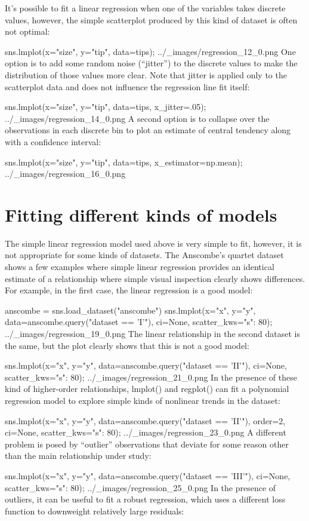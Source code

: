 It’s possible to fit a linear regression when one of the variables takes discrete values, however, the simple scatterplot produced by this kind of dataset is often not optimal:

sns.lmplot(x="size", y="tip", data=tips);
../_images/regression_12_0.png
One option is to add some random noise (“jitter”) to the discrete values to make the distribution of those values more clear. Note that jitter is applied only to the scatterplot data and does not influence the regression line fit itself:

sns.lmplot(x="size", y="tip", data=tips, x_jitter=.05);
../_images/regression_14_0.png
A second option is to collapse over the observations in each discrete bin to plot an estimate of central tendency along with a confidence interval:

sns.lmplot(x="size", y="tip", data=tips, x_estimator=np.mean);
../_images/regression_16_0.png
\section{Fitting different kinds of models}
The simple linear regression model used above is very simple to fit, however, it is not appropriate for some kinds of datasets. The Anscombe’s quartet dataset shows a few examples where simple linear regression provides an identical estimate of a relationship where simple visual inspection clearly shows differences. For example, in the first case, the linear regression is a good model:

anscombe = sns.load_dataset("anscombe")
sns.lmplot(x="x", y="y", data=anscombe.query("dataset == 'I'"),
           ci=None, scatter_kws={"s": 80});
../_images/regression_19_0.png
The linear relationship in the second dataset is the same, but the plot clearly shows that this is not a good model:

sns.lmplot(x="x", y="y", data=anscombe.query("dataset == 'II'"),
           ci=None, scatter_kws={"s": 80});
../_images/regression_21_0.png
In the presence of these kind of higher-order relationships, lmplot() and regplot() can fit a polynomial regression model to explore simple kinds of nonlinear trends in the dataset:

sns.lmplot(x="x", y="y", data=anscombe.query("dataset == 'II'"),
           order=2, ci=None, scatter_kws={"s": 80});
../_images/regression_23_0.png
A different problem is posed by “outlier” observations that deviate for some reason other than the main relationship under study:

sns.lmplot(x="x", y="y", data=anscombe.query("dataset == 'III'"),
           ci=None, scatter_kws={"s": 80});
../_images/regression_25_0.png
In the presence of outliers, it can be useful to fit a robust regression, which uses a different loss function to downweight relatively large residuals:

